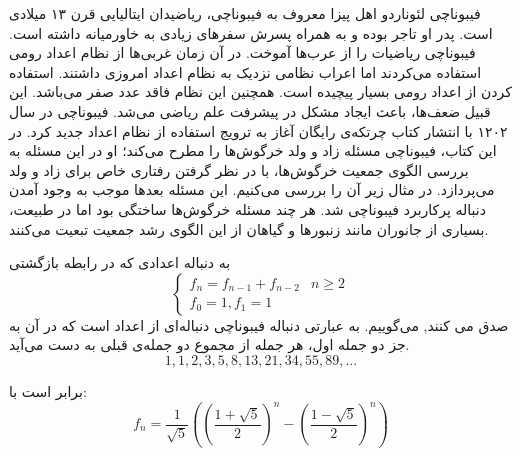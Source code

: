 \begin{EXTRA}{ فیبوناچی }
\p
{}
\p
لئوناردو اهل پیزا
معروف به
فیبوناچی،
 ریاضیدان ایتالیایی قرن 
۱۳
میلادی
است.
پدر او تاجر بوده و به همراه پسرش سفرهای زیادی به خاورمیانه داشته است.
فیبوناچی ریاضیات را از عرب‌ها آموخت.
در آن زمان غربی‌ها از نظام اعداد رومی استفاده می‌کردند اما اعراب نظامی نزدیک به نظام اعداد امروزی داشتند.
استفاده کردن از اعداد رومی بسیار پیچیده‌ است. همچنین این نظام فاقد عدد صفر می‌باشد. این قبیل ضعف‌ها، باعث ایجاد مشکل در پیشرفت علم ریاضی می‌شد.
فیبوناچی در سال ۱۲۰۲ با انتشار کتاب
چرتکه‌ی رایگان
آغاز به
ترویج استفاده از نظام اعداد جدید کرد.
در این کتاب، فیبوناچی مسئله زاد و ولد خرگوش‌ها را مطرح می‌کند؛ او در این مسئله به بررسی الگوی جمعیت خرگوش‌ها، با در نظر گرفتن رفتاری خاص برای زاد و ولد می‌پردازد. در مثال زیر آن را بررسی می‌کنیم.
این مسئله بعدها  موجب به وجود آمدن دنباله پرکاربرد فیبوناچی شد.
هر چند مسئله خرگوش‌ها ساختگی بود اما در طبیعت، بسیاری از جانوران مانند زنبورها و گیاهان از این الگوی رشد جمعیت تبعیت می‌کنند.
\end{EXTRA}



\begin{DEFINITION}
  \p
    به دنباله اعدادی که در رابطه بازگشتی
  \[\begin{cases}
      f_{n}=f_{n-1} + f_{n-2} & n\geq 2 \\
      
      f_0=1 ,
      f_1 = 1
  \end{cases}
  \]
  صدق می کنند,
    می‌گوییم.
    به عبارتی دنباله فیبوناچی
    دنباله‌ای از اعداد است که در آن به جز دو جمله اول، هر جمله از مجموع دو جمله‌ی قبلی به دست می‌آید.
    \p
  $$1, 1, 2, 3, 5, 8, 13, 21, 34, 55, 89, ...$$
\end{DEFINITION}




\begin{THEOREM}
    \p
    برابر است با:
    $$f_n = \frac{1}{\sqrt{5}}((\frac{1 + \sqrt{5}}{2})^{n} - (\frac{1 - \sqrt{5}}{2})^{n})$$
\end{THEOREM}



